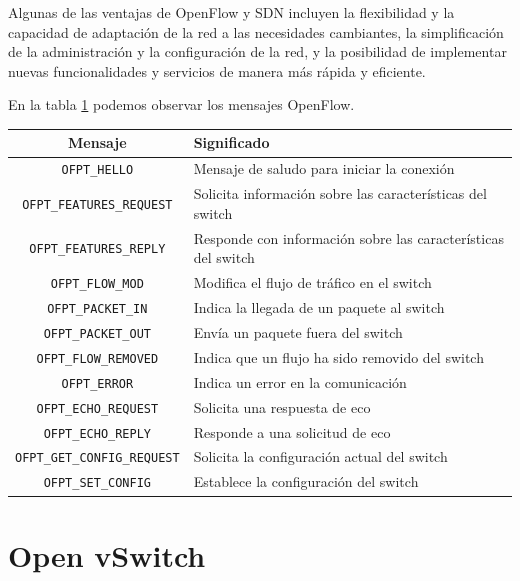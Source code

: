 \documentclass[a4paper, 12pt]{book}
\begin{document}
	
	Algunas de las ventajas de OpenFlow y SDN incluyen la flexibilidad y la capacidad de adaptación de la red a las necesidades cambiantes, la simplificación de la administración y la configuración de la red, y la posibilidad de implementar nuevas funcionalidades y servicios de manera más rápida y eficiente.
	
	En la tabla \ref{tab:openflow} podemos observar los mensajes OpenFlow.
	
	\begin{table}[H] %
		\centering
		\label{tab:openflow}
		\begin{tabular}{|c|l|}
			\hline
			\textbf{Mensaje} & \textbf{Significado} \\
			\hline
			\texttt{OFPT\_HELLO} & Mensaje de saludo para iniciar la conexión \\
			\hline
			\texttt{OFPT\_FEATURES\_REQUEST} & Solicita información sobre las características del switch \\
			\hline
			\texttt{OFPT\_FEATURES\_REPLY} & Responde con información sobre las características del switch \\
			\hline
			\texttt{OFPT\_FLOW\_MOD} & Modifica el flujo de tráfico en el switch \\
			\hline
			\texttt{OFPT\_PACKET\_IN} & Indica la llegada de un paquete al switch \\
			\hline
			\texttt{OFPT\_PACKET\_OUT} & Envía un paquete fuera del switch \\
			\hline
			\texttt{OFPT\_FLOW\_REMOVED} & Indica que un flujo ha sido removido del switch \\
			\hline
			\texttt{OFPT\_ERROR} & Indica un error en la comunicación \\
			\hline
			\texttt{OFPT\_ECHO\_REQUEST} & Solicita una respuesta de eco \\
			\hline
			\texttt{OFPT\_ECHO\_REPLY} & Responde a una solicitud de eco \\
			\hline
			\texttt{OFPT\_GET\_CONFIG\_REQUEST} & Solicita la configuración actual del switch \\
			\hline
			\texttt{OFPT\_SET\_CONFIG} & Establece la configuración del switch \\
			\hline
		\end{tabular}
	\end{table}
	
	\section{Open vSwitch} 
	\label{sec:vswitch}
	
\end{document}
